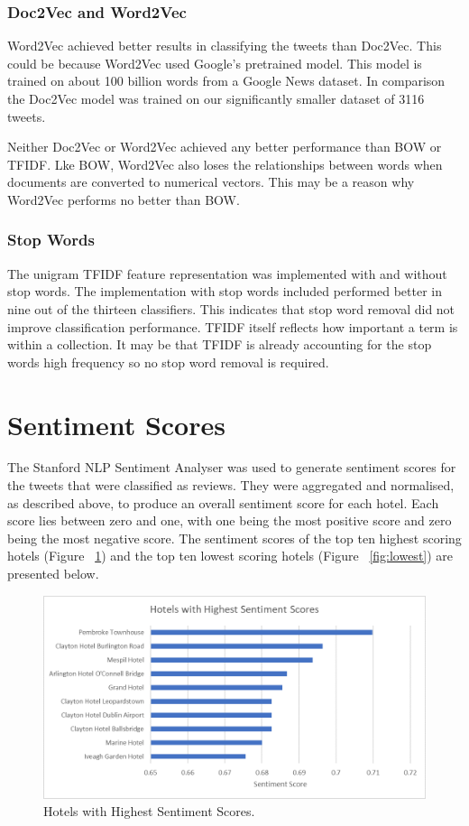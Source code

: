 \subsubsection*{Doc2Vec and Word2Vec}

Word2Vec achieved better results in classifying the tweets than Doc2Vec. This could be because Word2Vec used Google's pretrained model. This model is trained on about 100 billion words from a Google News dataset. In comparison the Doc2Vec model was trained on our significantly smaller dataset of 3116 tweets.

Neither Doc2Vec or Word2Vec achieved any better performance than BOW or TFIDF. Lke BOW, Word2Vec also loses the relationships between words when documents are converted to numerical vectors. This may be a reason why Word2Vec performs no better than BOW.

\subsubsection*{Stop Words}

The unigram TFIDF feature representation was implemented with and without stop words. The implementation with stop words included performed better in nine out of the thirteen classifiers. This indicates that stop word removal did not improve classification performance. TFIDF itself reflects how important a term is within a collection. It may be that TFIDF is already accounting for the stop words high frequency so no stop word removal is required.

\section{Sentiment Scores}

The Stanford NLP Sentiment Analyser was used to generate sentiment scores for the tweets that were classified as reviews. They were aggregated and normalised, as described above, to produce an overall sentiment score for each hotel. Each score lies between zero and one, with one being the most positive score and zero being the most negative score. The sentiment scores of the top ten highest scoring hotels (Figure ~\ref{fig:highest}) and the top ten lowest scoring hotels (Figure ~\ref{fig:lowest}) are presented below.

\begin{figure}[h!]
\centering
\includegraphics[width=1\textwidth]{evaluation/highest.png}
\caption{\label{fig:highest} Hotels with Highest Sentiment Scores.}
\end{figure}

